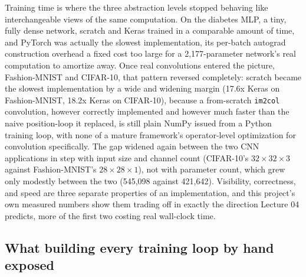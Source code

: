 \documentclass[11pt]{article}
\newcommand{\code}[1]{\texttt{#1}}
\begin{document}
Training time is where the three abstraction levels stopped behaving like
interchangeable views of the same computation. On the diabetes MLP, a tiny,
fully dense network, scratch and Keras trained in a comparable amount of
time, and PyTorch was actually the slowest implementation, its per-batch
autograd construction overhead a fixed cost too large for a 2,177-parameter
network's real computation to amortize away. Once real convolutions entered
the picture, Fashion-MNIST and CIFAR-10, that pattern reversed completely:
scratch became the slowest implementation by a wide and widening margin (17.6x
Keras on Fashion-MNIST, 18.2x Keras on CIFAR-10), because a from-scratch
\code{im2col} convolution, however correctly implemented and however much
faster than the naive position-loop it replaced, is still plain NumPy issued
from a Python training loop, with none of a mature framework's operator-level
optimization for convolution specifically. The gap widened again between the
two CNN applications in step with input size and channel count (CIFAR-10's
$32\times32\times3$ against Fashion-MNIST's $28\times28\times1$), not with
parameter count, which grew only modestly between the two (545,098 against
421,642). Visibility, correctness, and speed are three separate properties of
an implementation, and this project's own measured numbers show them trading
off in exactly the direction Lecture 04 predicts, more of the first two
costing real wall-clock time.

\subsection{What building every training loop by hand exposed}
\end{document}
